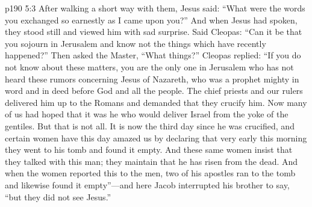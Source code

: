 \vs p190 5:3 After walking a short way with them, Jesus said: \textcolor{ubdarkred}{“What were the words you exchanged so earnestly as I came upon you?”} And when Jesus had spoken, they stood still and viewed him with sad surprise. Said Cleopas: “Can it be that you sojourn in Jerusalem and know not the things which have recently happened?” Then asked the Master, “What things?” Cleopas replied: “If you do not know about these matters, you are the only one in Jerusalem who has not heard these rumors concerning Jesus of Nazareth, who was a prophet mighty in word and in deed before God and all the people. The chief priests and our rulers delivered him up to the Romans and demanded that they crucify him. Now many of us had hoped that it was he who would deliver Israel from the yoke of the gentiles. But that is not all. It is now the third day since he was crucified, and certain women have this day amazed us by declaring that very early this morning they went to his tomb and found it empty. And these same women insist that they talked with this man; they maintain that he has risen from the dead. And when the women reported this to the men, two of his apostles ran to the tomb and likewise found it empty”---and here Jacob interrupted his brother to say, “but they did not see Jesus.”
